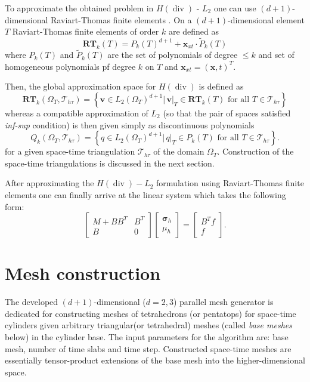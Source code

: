 \documentclass[12pt]{article}
\renewcommand{\div}{\operatorname{div}}
\def\bsigma{{\boldsymbol \sigma}}
\begin{document}
To approximate the obtained problem in $H(\div)$ - $L_2$ one can use $(d+1)$-dimensional Raviart-Thomas finite elements \cite{RT}. On a $(d+1)$-dimensional element $T$ Raviart-Thomas finite elements of order $k$ are defined as
$$
\mathbf{RT}_k(T) = P_k(T)^{d+1} + \mathbf{x}_{xt} \cdot \tilde{P}_k(T)
$$
where $P_k(T)$ and $\tilde{P}_k(T)$ are the set of polynomials of degree $\leq k$ and set of homogeneous polynomials pf degree $k$ on $T$ and $\mathbf{x}_{xt} = (\mathbf{x},t)^T$. 

Then, the global approximation space for $H(\div)$ is defined as 
$$
\mathbf{RT}_k(\Omega_T, \mathcal{T}_{h\tau}) = \left\{ \mathbf{v} \in L_2(\Omega_T)^{d+1} | \, \mathbf{v} |_T \in \mathbf{RT}_k(T) \, \, \text{for all} \, \, T \in \mathcal{T}_{h\tau} \right\}
$$
whereas a compatible approximation of $L_2$ (so that the pair of spaces satisfied \textit{inf-sup} condition) is then given simply as discontinuous polynomials
$$
Q_k (\Omega_T, \mathcal{T}_{h\tau}) = \left\{ q \in L_2(\Omega_T)^{d+1} | \, q |_T \in P_k(T) \, \, \text{for all} \, \, T \in \mathcal{T}_{h\tau} \right\}.
$$
for a given space-time triangulation $\mathcal{T}_{h\tau}$ of the domain $\Omega_T$. Construction of the space-time triangulations is discussed in the next section.

After approximating the $H(\div) - L_2$ formulation using Raviart-Thomas finite elements one can finally arrive at the linear system which takes the following form:
$$
\left[
\begin{array}{cc}
M + BB^T & B^T \\
B & 0 
\end{array} \right]  
\left[
\begin{array}{c}
\bsigma_h \\
\mu_h
\end{array}
\right]
 = \left[
\begin{array}{c}
B^T f\\
f
\end{array} \right].
$$

\section{Mesh construction}
The developed $(d+1)$-dimensional ($d=2,3$) parallel mesh generator is dedicated for constructing meshes of tetrahedrons (or pentatops) for space-time cylinders given arbitrary triangular(or tetrahedral) meshes (called \textit{base meshes} below) in the cylinder base. The input parameters for the algorithm are: base mesh, number of time slabs and time step. Constructed space-time meshes are essentially tensor-product extensions of the base mesh into the higher-dimensional space. %
\end{document}
